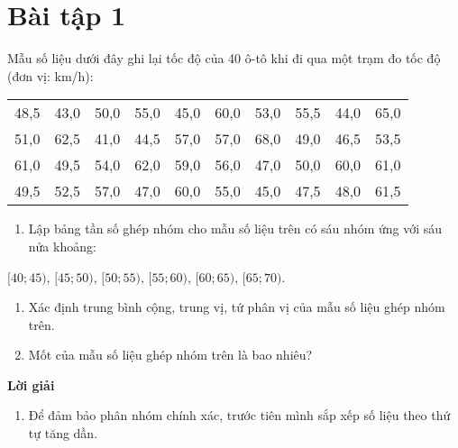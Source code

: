 \documentclass[
  letterpaper,
  DIV=11,
  numbers=noendperiod]{scrartcl}
\providecommand{\tightlist}{%
  \setlength{\itemsep}{0pt}\setlength{\parskip}{0pt}}\usepackage{longtable,booktabs,array}
\begin{document}
\section*{Bài tập 1}

Mẫu số liệu dưới đây ghi lại tốc độ của 40 ô-tô khi đi qua một trạm đo
tốc độ (đơn vị: km/h):

\begin{table}[!h]
\centering
\begin{tabular}{cccccccccc}
\toprule
48,5 & 43,0 & 50,0 & 55,0 & 45,0 & 60,0 & 53,0 & 55,5 & 44,0 & 65,0\\
51,0 & 62,5 & 41,0 & 44,5 & 57,0 & 57,0 & 68,0 & 49,0 & 46,5 & 53,5\\
61,0 & 49,5 & 54,0 & 62,0 & 59,0 & 56,0 & 47,0 & 50,0 & 60,0 & 61,0\\
49,5 & 52,5 & 57,0 & 47,0 & 60,0 & 55,0 & 45,0 & 47,5 & 48,0 & 61,5\\
\bottomrule
\end{tabular}
\end{table}

\begin{enumerate}
\def\labelenumi{\alph{enumi}.}
\tightlist
\item
  Lập bảng tần số ghép nhóm cho mẫu số liệu trên có sáu nhóm ứng với sáu
  nửa khoảng:
\end{enumerate}

\begin{center}
$[40; 45)$, $[45 ; 50)$, $[50; 55)$, $[55 ; 60)$, $[60; 65)$, $[65; 70)$.
\end{center}

\begin{enumerate}
\def\labelenumi{\alph{enumi}.}
\setcounter{enumi}{1}
\item
  Xác định trung bình cộng, trung vị, tứ phân vị của mẫu số liệu ghép
  nhóm trên.
\item
  Mốt của mẫu số liệu ghép nhóm trên là bao nhiêu?
\end{enumerate}

\begin{center}
\textbf{Lời giải}
\end{center}

\begin{enumerate}
\def\labelenumi{\alph{enumi}.}
\tightlist
\item
  Để đảm bảo phân nhóm chính xác, trước tiên mình sắp xếp số liệu theo
  thứ tự tăng dần.
\end{enumerate}
\end{document}
